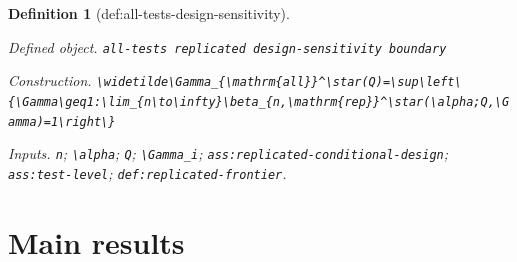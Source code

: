 \documentclass{article}
\newtheorem{definition}{Definition}
\begin{document}
\begin{definition}[def:all-tests-design-sensitivity]\label{def:all-tests-design-sensitivity}
\par\smallskip\noindent\emph{Defined object.} \texttt{all-\allowbreak{}tests replicated design-\allowbreak{}sensitivity boundary}
\par\smallskip\noindent\emph{Construction.} \texttt{\textbackslash{}\allowbreak{}widetilde\textbackslash{}\allowbreak{}Gamma\_\allowbreak{}\{\textbackslash{}\allowbreak{}mathrm\{all\}\allowbreak{}\}\allowbreak{}\textasciicircum{}\textbackslash{}\allowbreak{}star(Q)=\allowbreak{}\textbackslash{}\allowbreak{}sup\textbackslash{}\allowbreak{}left\textbackslash{}\allowbreak{}\{\textbackslash{}\allowbreak{}Gamma\textbackslash{}\allowbreak{}geq1:\allowbreak{}\textbackslash{}\allowbreak{}lim\_\allowbreak{}\{n\textbackslash{}\allowbreak{}to\textbackslash{}\allowbreak{}infty\}\allowbreak{}\textbackslash{}\allowbreak{}beta\_\allowbreak{}\{n,\allowbreak{}\textbackslash{}\allowbreak{}mathrm\{rep\}\allowbreak{}\}\allowbreak{}\textasciicircum{}\textbackslash{}\allowbreak{}star(\textbackslash{}\allowbreak{}alpha;\allowbreak{}Q,\allowbreak{}\textbackslash{}\allowbreak{}Gamma)=\allowbreak{}1\textbackslash{}\allowbreak{}right\textbackslash{}\allowbreak{}\}\allowbreak{}}
\par\smallskip\noindent\emph{Inputs.} \texttt{n}; \texttt{\textbackslash{}\allowbreak{}alpha}; \texttt{Q}; \texttt{\textbackslash{}\allowbreak{}Gamma\_\allowbreak{}i}; \texttt{ass:\allowbreak{}replicated-\allowbreak{}conditional-\allowbreak{}design}; \texttt{ass:\allowbreak{}test-\allowbreak{}level}; \texttt{def:\allowbreak{}replicated-\allowbreak{}frontier}.
\end{definition}

\section{Main results}
\end{document}
